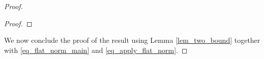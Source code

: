 \documentclass[12pt]{amsbook}%
\theoremstyle{definition}
\theoremstyle{remark}
\numberwithin{section}{chapter}
\numberwithin{subsection}{section}
\numberwithin{figure}{chapter}
\DeclareMathOperator{\vol}{vol}
\def\fd{{\mathfrak{d}}}
\def\diam{\operatorname{diam}}
\begin{document}
{{\begin{proof}
\begin{proof}
\end{proof}

We now conclude the proof of the result using Lemma \ref{lem_two_bound} together with \eqref{eq_flat_norm_main} and \eqref{eq_apply_flat_norm}.
\end{proof}

}}
\end{document}
